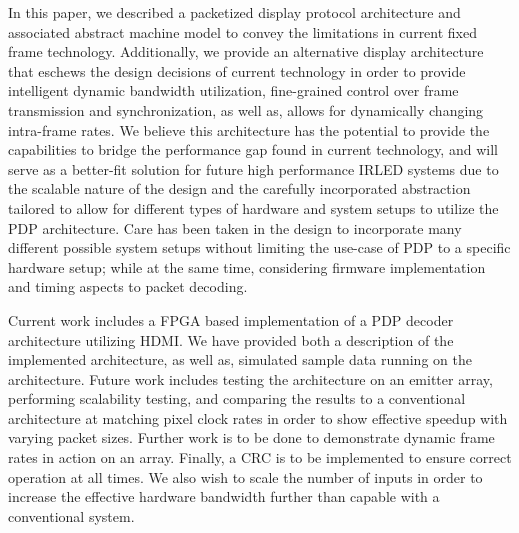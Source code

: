 \label{chap:conclusion}
In this paper, we described a packetized display protocol architecture and associated abstract machine model to convey the limitations in current fixed frame technology. Additionally, we provide an alternative display architecture that eschews the design decisions of current technology in order to provide intelligent dynamic bandwidth utilization, fine-grained control over frame transmission and synchronization, as well as, allows for dynamically changing intra-frame rates. We believe this architecture has the potential to provide the capabilities to bridge the performance gap found in current technology, and will serve as a better-fit solution for future high performance IRLED systems due to the scalable nature of the design and the carefully incorporated abstraction tailored to allow for different types of hardware and system setups to utilize the PDP architecture. Care has been taken in the design to incorporate many different possible system setups without limiting the use-case of PDP to a specific hardware setup; while at the same time, considering firmware implementation and timing aspects to packet decoding.

Current work includes a FPGA based implementation of a PDP decoder architecture utilizing HDMI. We have provided both a description of the implemented architecture, as well as, simulated sample data running on the architecture. Future work includes testing the architecture on an emitter array, performing scalability testing, and comparing the results to a conventional architecture at matching pixel clock rates in order to show effective speedup with varying packet sizes. Further work is to be done to demonstrate dynamic frame rates in action on an array. Finally, a CRC is to be implemented to ensure correct operation at all times. We also wish to scale the number of inputs in order to increase the effective hardware bandwidth further than capable with a conventional system.
